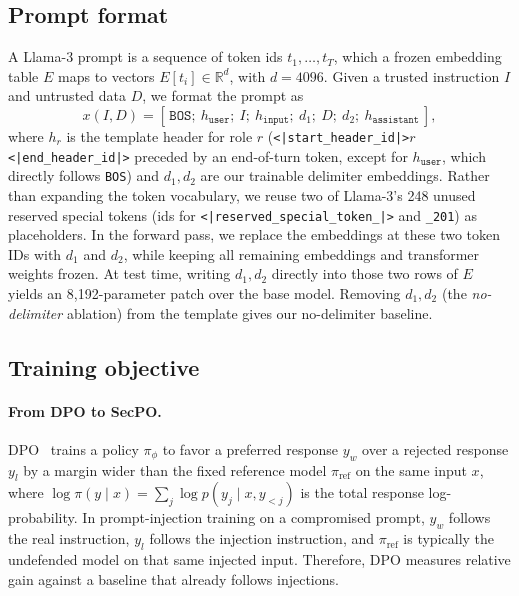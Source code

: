 \documentclass{article}
\begin{document}
\subsection{Prompt format}
\label{sec:format}

A Llama-3 prompt is a sequence of token ids $t_1, \dots, t_T$, which a frozen embedding table $E$ maps to vectors $E[t_i] \in \mathbb{R}^{d}$, with $d = 4096$. Given a trusted instruction $I$ and untrusted data $D$, we format the prompt as
\begin{equation}
  x(I, D) = [\,\texttt{BOS};\ h_{\texttt{user}};\ I;\ h_{\texttt{input}};\ d_1;\ D;\ d_2;\ h_{\texttt{assistant}}\,],
  \label{eq:prompt}
\end{equation}
where $h_r$ is the template header for role $r$ (\texttt{<|start\_header\_id|>}$r$\texttt{<|end\_header\_id|>} preceded by an end-of-turn token, except for $h_{\texttt{user}}$, which directly follows \texttt{BOS}) and $d_1, d_2$ are our trainable delimiter embeddings. Rather than expanding the token vocabulary, we reuse two of Llama-3's 248 unused reserved special tokens (ids for \texttt{<|reserved\_\allowbreak special\_\allowbreak token\_|>} and \texttt{\_201}) as placeholders. In the forward pass, we replace the embeddings at these two token IDs with $d_1$ and $d_2$, while keeping all remaining embeddings and transformer weights frozen. At test time, writing $d_1, d_2$ directly into those two rows of $E$ yields an 8{,}192-parameter patch over the base model. Removing $d_1, d_2$ (the \emph{no-delimiter} ablation) from the template gives our no-delimiter baseline.

\subsection{Training objective}
\label{sec:loss}

\paragraph{From DPO to SecPO.} DPO~\cite{rafailov2023dpo} trains a policy $\pi_\phi$ to favor a preferred response $y_w$ over a rejected response $y_l$ by a margin wider than the fixed reference model $\pi_{\mathrm{ref}}$ on the same input $x$, where $\log \pi(y \mid x) = \sum_{j} \log p(y_j \mid x, y_{<j})$ is the total response log-probability. In prompt-injection training on a compromised prompt, $y_w$ follows the real instruction, $y_l$ follows the injection instruction, and $\pi_{\mathrm{ref}}$ is typically the undefended model on that same injected input. Therefore, DPO measures relative gain against a baseline that already follows injections.
\end{document}
